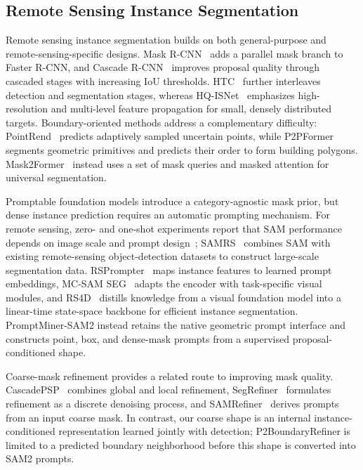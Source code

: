 \documentclass[letterpaper,journal]{IEEEtran}
\begin{document}
\subsection{Remote Sensing Instance Segmentation}
Remote sensing instance segmentation builds on both general-purpose and remote-sensing-specific
designs. Mask R-CNN~\cite{ref_maskrcnn} adds a parallel mask branch to Faster R-CNN, and
Cascade R-CNN~\cite{ref_cascade} improves proposal quality through cascaded stages with
increasing IoU thresholds. HTC~\cite{ref_htc} further interleaves detection and segmentation
stages, whereas HQ-ISNet~\cite{ref_hqisnet} emphasizes high-resolution and multi-level feature
propagation for small, densely distributed targets. Boundary-oriented methods address a
complementary difficulty: PointRend~\cite{ref_pointrend} predicts adaptively sampled uncertain
points, while P2PFormer~\cite{ref_p2pformer} segments geometric primitives and predicts their
order to form building polygons. Mask2Former~\cite{ref_mask2former} instead uses a set of mask
queries and masked attention for universal segmentation.

Promptable foundation models introduce a category-agnostic mask prior, but dense instance
prediction requires an automatic prompting mechanism. For remote sensing, zero- and one-shot
experiments report that SAM performance depends on image scale and prompt
design~\cite{ref_samrsapp}; SAMRS~\cite{ref_samrs} combines SAM with existing remote-sensing
object-detection datasets to construct large-scale segmentation data.
RSPrompter~\cite{ref_rsprompter} maps instance features to learned prompt embeddings, MC-SAM
SEG~\cite{ref_mcsamseg} adapts the encoder with task-specific visual modules, and
RS4D~\cite{ref_rs4d} distills knowledge from a visual foundation model into a linear-time
state-space backbone for efficient instance segmentation. PromptMiner-SAM2 instead retains the
native geometric prompt interface and constructs point, box, and dense-mask prompts from a
supervised proposal-conditioned shape.

Coarse-mask refinement provides a related route to improving mask quality.
CascadePSP~\cite{ref_cascadepsp} combines global and local refinement,
SegRefiner~\cite{ref_segrefiner} formulates refinement as a discrete denoising process, and
SAMRefiner~\cite{ref_samrefiner} derives prompts from an input coarse mask. In contrast, our
coarse shape is an internal instance-conditioned representation learned jointly with detection;
P2BoundaryRefiner is limited to a predicted boundary neighborhood before this shape is
converted into SAM2 prompts.
\end{document}
